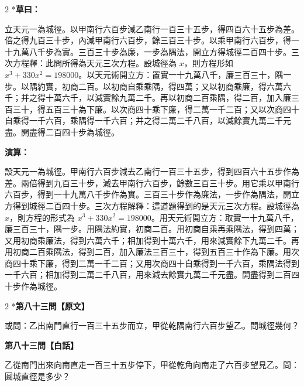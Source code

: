 \documentclass[11pt,a4paper]{article}
\begin{document}
\begin{paracol}{2}
\switchcolumn[0]*\textbf{草曰：}

\small 立天元一為城徑。以甲南行六百步減乙南行一百三十五步，得四百六十五步為差。倍之得九百三十步，內減甲南行六百步，餘三百三十步。以乘甲南行六百步，得一十九萬八千步為實。三百三十步為廉，一步為隅法，開立方得城徑二百四十步。三次方程釋：此問所得為天元三次方程。設城徑為 $x$，則方程形如 $x^3 + 330x^2 = 198000$。以天元術開立方：置實一十九萬八千，廉三百三十，隅一步。以隅約實，初商二百。以初商自乘乘隅，得四萬；又以初商乘廉，得六萬六千；并之得十萬六千，以減實餘九萬二千。再以初商二百乘隅，得二百，加入廉三百三十，得五百三十為下廉。以次商四十乘下廉，得二萬一千二百；又以次商四十自乘得一千六百，乘隅得一千六百；并之得二萬二千八百，以減餘實九萬二千元盡。開盡得二百四十步為城徑。

\switchcolumn\textbf{演算：}

\small 設天元一為城徑。甲南行六百步減去乙南行一百三十五步，得到四百六十五步作為差。兩倍得到九百三十步，減去甲南行六百步，餘數三百三十步。用它乘以甲南行六百步，得到一十九萬八千步作為實。三百三十步作為廉法，一步作為隅法，開立方得到城徑二百四十步。三次方程解釋：這道題得到的是天元三次方程。設城徑為 $x$，則方程的形式為 $x^3 + 330x^2 = 198000$。用天元術開立方：取實一十九萬八千，廉三百三十，隅一步。用隅法約實，初商二百。用初商自乘再乘隅法，得到四萬；又用初商乘廉法，得到六萬六千；相加得到十萬六千，用來減實餘下九萬二千。再用初商二百乘隅法，得到二百，加入廉法三百三十，得到五百三十作為下廉。用次商四十乘下廉，得到二萬一千二百；又用次商四十自乘得到一千六百，乘隅法得到一千六百；相加得到二萬二千八百，用來減去餘實九萬二千元盡。開盡得到二百四十步作為城徑。
\end{paracol}

\vspace{0.1cm}
\noindent{}
\par\vspace{0.3cm}

\begin{paracol}{2}
\switchcolumn[0]*\noindent\textbf{第八十三問【原文】}

\small 或問：乙出南門直行一百三十五步而立，甲從乾隅南行六百步望乙。問城徑幾何？

\switchcolumn\noindent\textbf{第八十三問【白話】}

\small 乙從南門出來向南直走一百三十五步停下，甲從乾角向南走了六百步望見乙。問：圓城直徑是多少？
\end{paracol}
\end{document}
